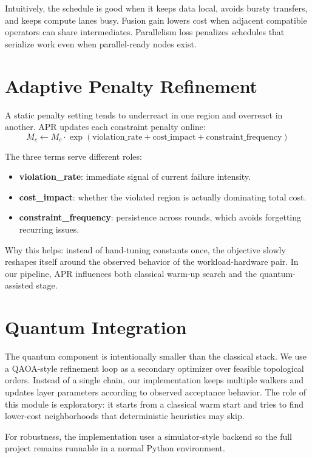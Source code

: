 \documentclass[11pt]{article}
\begin{document}
Intuitively, the schedule is good when it keeps data local, avoids bursty transfers, and keeps compute lanes busy. Fusion gain lowers cost when adjacent compatible operators can share intermediates. Parallelism loss penalizes schedules that serialize work even when parallel-ready nodes exist.

\section{Adaptive Penalty Refinement}
A static penalty setting tends to underreact in one region and overreact in another. APR updates each constraint penalty online:
\[
M_c \leftarrow M_c \cdot \exp(\text{violation\_rate} + \text{cost\_impact} + \text{constraint\_frequency})
\]

The three terms serve different roles:
\begin{itemize}
    \item \textbf{violation\_rate}: immediate signal of current failure intensity.
    \item \textbf{cost\_impact}: whether the violated region is actually dominating total cost.
    \item \textbf{constraint\_frequency}: persistence across rounds, which avoids forgetting recurring issues.
\end{itemize}

Why this helps: instead of hand-tuning constants once, the objective slowly reshapes itself around the observed behavior of the workload-hardware pair. In our pipeline, APR influences both classical warm-up search and the quantum-assisted stage.

\section{Quantum Integration}
The quantum component is intentionally smaller than the classical stack. We use a QAOA-style refinement loop as a secondary optimizer over feasible topological orders. Instead of a single chain, our implementation keeps multiple walkers and updates layer parameters according to observed acceptance behavior. The role of this module is exploratory: it starts from a classical warm start and tries to find lower-cost neighborhoods that deterministic heuristics may skip.

For robustness, the implementation uses a simulator-style backend so the full project remains runnable in a normal Python environment.
\end{document}

